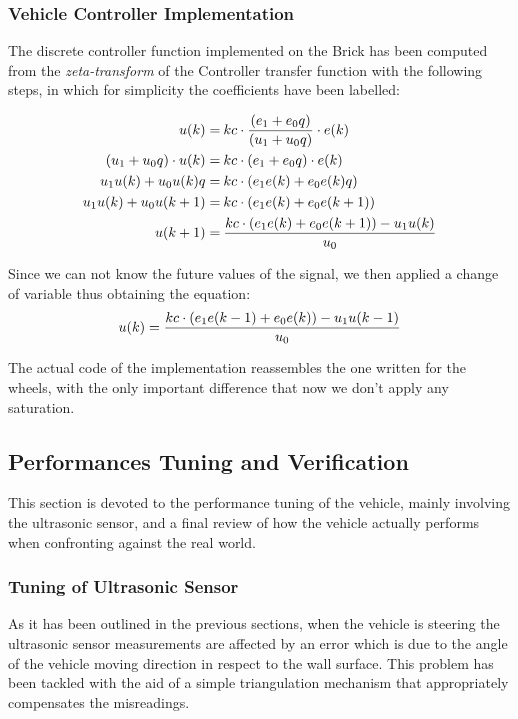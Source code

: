 \subsubsection{Vehicle Controller Implementation}

The discrete controller function implemented on the Brick has been computed  from the \textit{zeta-transform} of the Controller transfer function with the following steps, in which for simplicity the coefficients have been labelled:

\[
\begin{split}
u(k) =& \: kc \cdot{}  {(e_1 + e_0q) \over (u_1 + u_0q)} \cdot{} e(k)\\
(u_1 + u_0q)\cdot{}u(k) =&\: kc \cdot{} (e_1 + e_0q)\cdot{}e(k)\\
u_1u(k) + u_0u(k)q =&\: kc \cdot{} (e_1e(k) + e_0e(k)q)\\
u_1u(k) + u_0u(k+1) =&\: kc \cdot{} (e_1e(k) + e_0e(k+1))\\
u(k+1) =&\: {kc \cdot{}(e_1e(k) + e_0e(k+1)) - u_1u(k) \over{} u_0}
\end{split}
\]

Since we can not know the future values of the signal, we then applied a change of variable thus obtaining the equation:
\[
u(k) = {kc \cdot{}(e_1e(k-1) + e_0e(k)) - u_1u(k-1) \over{} u_0}
\]

The actual code of the implementation reassembles the one written for the wheels, with the only important difference that now we don't apply any saturation.

\subsection{Performances Tuning and Verification}

This section is devoted to the performance tuning of the vehicle, mainly involving the ultrasonic sensor, and a final review of how the vehicle actually performs when confronting against the real world.


\subsubsection{Tuning of Ultrasonic Sensor}

As it has been outlined in the previous sections, when the vehicle is steering the ultrasonic sensor measurements are affected by an error which is due to the angle of the vehicle moving direction in respect to the wall surface. This problem has been tackled with the aid of a simple triangulation mechanism that appropriately compensates the misreadings.

